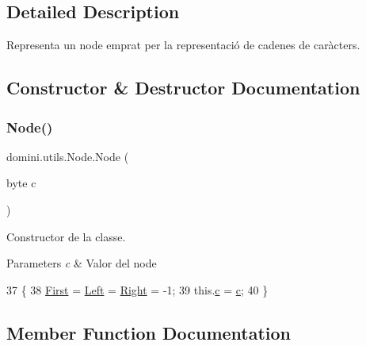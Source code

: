 \subsection{Detailed Description}
Representa un node emprat per la representació de cadenes de caràcters. 

\subsection{Constructor \& Destructor Documentation}
\mbox{\label{classdomini_1_1utils_1_1Node_ae337ba617322158f0ac240c900350278}} 
\subsubsection{\texorpdfstring{Node()}{Node()}}
{\footnotesize\ttfamily domini.\+utils.\+Node.\+Node (\begin{DoxyParamCaption}\item[{byte}]{c }\end{DoxyParamCaption})\hspace{0.3cm}{\ttfamily [inline]}}



Constructor de la classe. 


\begin{DoxyParams}{Parameters}
{\em c} & Valor del node \\
\hline
\end{DoxyParams}

\begin{DoxyCode}
37                         \{
38         \hyperlink{classdomini_1_1utils_1_1Node_a42db9f259f129c72cab2052a0f8ba42a}{First} = \hyperlink{classdomini_1_1utils_1_1Node_a2f1d911cf52953b29d42e5e020b82dbf}{Left} = \hyperlink{classdomini_1_1utils_1_1Node_a73c97e595bad2513ee0a06ee4620236a}{Right} = -1;
39         this.\hyperlink{classdomini_1_1utils_1_1Node_a2fbef2557db813ae02a2d52032eaa6e1}{c} = \hyperlink{classdomini_1_1utils_1_1Node_a2fbef2557db813ae02a2d52032eaa6e1}{c};
40     \}
\end{DoxyCode}


\subsection{Member Function Documentation}
\mbox{\label{classdomini_1_1utils_1_1Node_a3fe2e958308c90d24607a4e191680089}} 
